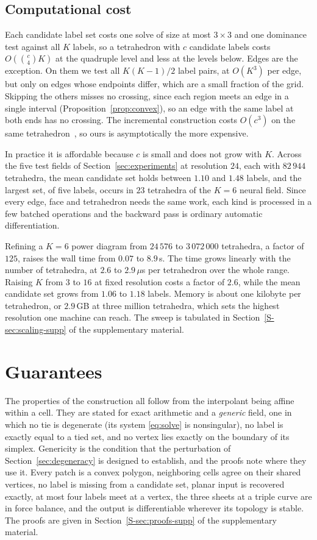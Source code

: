\documentclass{egpubl}
\newcommand{\sref}[1]{\ref*{S-#1}}
\newcommand{\supp}[1]{Section~\sref{#1} of the supplementary material}
\theoremstyle{definition}
\begin{document}
\subsection{Computational cost}
\label{sec:cost}

Each candidate label set costs one solve of size at most $3\times3$ and one
dominance test against all $K$ labels, so a tetrahedron with $c$ candidate
labels costs $O(\binom{c}{4}K)$ at the quadruple level and less at the levels
below. Edges are the exception. On them we test all $K(K-1)/2$ label pairs,
at $O(K^3)$ per edge, but only on edges whose endpoints differ, which are a
small fraction of the grid. Skipping the others misses no crossing, since each region
meets an edge in a single interval (Proposition~\ref{prop:convex}), so an edge
with the same label at both ends has no crossing. The incremental construction costs $O(c^3)$ on the same
tetrahedron~\cite{du2022}, so ours is asymptotically the more expensive.

In practice it is affordable because $c$ is small and does not grow with $K$.
Across the five test fields of Section~\ref{sec:experiments} at resolution
$24$, each with $82\,944$ tetrahedra, the mean candidate set holds between
$1.10$ and $1.48$ labels, and the largest set, of five labels, occurs in $23$
tetrahedra of the $K=6$ neural field. Since
every edge, face and tetrahedron needs the same work, each kind is processed
in a few batched operations and the backward pass is ordinary automatic
differentiation.

Refining a $K=6$ power diagram from $24\,576$ to
$3\,072\,000$ tetrahedra, a factor of $125$, raises the wall time from $0.07$
to $8.9$\,s. The time grows linearly with the number of tetrahedra, at $2.6$
to $2.9\,\mu$s per tetrahedron over the whole range. Raising $K$ from $3$ to
$16$ at fixed resolution costs a factor of $2.6$, while the mean candidate set
grows from $1.06$ to $1.18$ labels. Memory is about one
kilobyte per tetrahedron, or $2.9$\,GB at three million tetrahedra, which sets
the highest resolution one machine can reach. The sweep is tabulated in
\supp{sec:scaling-supp}.

\section{Guarantees}
\label{sec:guarantees}

\noindent The properties of the construction all follow from the
interpolant being affine within a cell. They are stated for exact arithmetic and a \emph{generic} field,
one in which no tie is degenerate (its system \eqref{eq:solve} is
nonsingular), no label is exactly equal to a tied set, and no vertex lies
exactly on the boundary of its simplex.
Genericity is the condition that the perturbation of
Section~\ref{sec:degeneracy} is designed to establish, and the proofs note
where they use it. Every
patch is a convex polygon, neighboring cells agree on their shared vertices,
no label is missing from a candidate set, planar input is recovered exactly,
at most four labels meet at a vertex, the three sheets at a triple curve are
in force balance, and the output is differentiable wherever its topology is
stable. The proofs are given in
\supp{sec:proofs-supp}.
\end{document}
